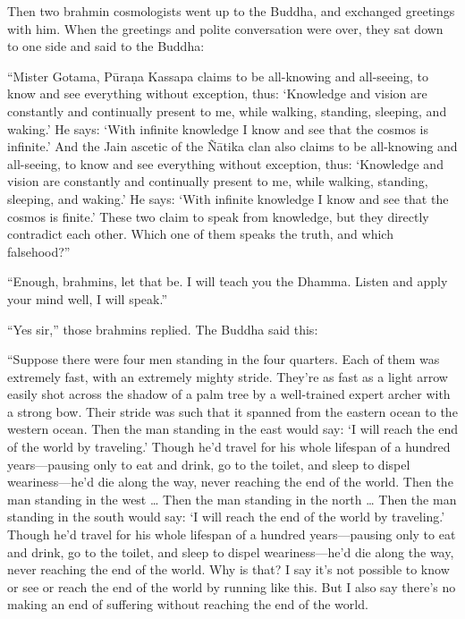 \documentclass[12pt,openany]{book}%
\begin{document}
Then two brahmin cosmologists went up to the Buddha, and exchanged greetings with him. When the greetings and polite conversation were over, they sat down to one side and said to the Buddha: 

“Mister Gotama, \textsanskrit{Pūraṇa} Kassapa claims to be all-knowing and all-seeing, to know and see everything without exception, thus: ‘Knowledge and vision are constantly and continually present to me, while walking, standing, sleeping, and waking.’ He says: ‘With infinite knowledge I know and see that the cosmos is infinite.’ And the Jain ascetic of the \textsanskrit{Ñātika} clan also claims to be all-knowing and all-seeing, to know and see everything without exception, thus: ‘Knowledge and vision are constantly and continually present to me, while walking, standing, sleeping, and waking.’ He says: ‘With infinite knowledge I know and see that the cosmos is finite.’ These two claim to speak from knowledge, but they directly contradict each other. Which one of them speaks the truth, and which falsehood?” 

“Enough, brahmins, let that be. I will teach you the Dhamma. Listen and apply your mind well, I will speak.” 

“Yes sir,” those brahmins replied. The Buddha said this: 

“Suppose there were four men standing in the four quarters. Each of them was extremely fast, with an extremely mighty stride. They’re as fast as a light arrow easily shot across the shadow of a palm tree by a well-trained expert archer with a strong bow. Their stride was such that it spanned from the eastern ocean to the western ocean. Then the man standing in the east would say: ‘I will reach the end of the world by traveling.’ Though he’d travel for his whole lifespan of a hundred years—pausing only to eat and drink, go to the toilet, and sleep to dispel weariness—he’d die along the way, never reaching the end of the world. Then the man standing in the west … Then the man standing in the north … Then the man standing in the south would say: ‘I will reach the end of the world by traveling.’ Though he’d travel for his whole lifespan of a hundred years—pausing only to eat and drink, go to the toilet, and sleep to dispel weariness—he’d die along the way, never reaching the end of the world. Why is that? I say it’s not possible to know or see or reach the end of the world by running like this. But I also say there’s no making an end of suffering without reaching the end of the world. 
\end{document}
